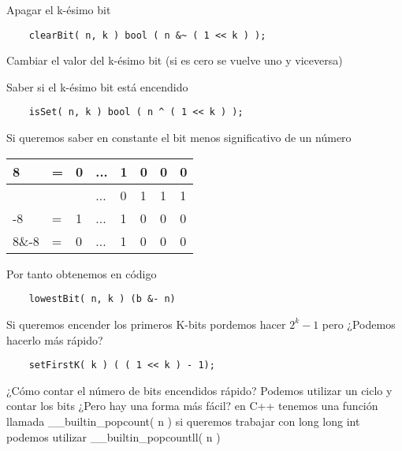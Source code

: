 Apagar el k-ésimo bit
\begin{lstlisting}
    clearBit( n, k ) bool ( n &~ ( 1 << k ) );
\end{lstlisting}

Cambiar el valor del k-ésimo bit (si es cero se vuelve uno y viceversa)

Saber si el k-ésimo bit está encendido 
\begin{lstlisting}
    isSet( n, k ) bool ( n ^ ( 1 << k ) );
\end{lstlisting}

Si queremos saber en constante el bit menos significativo de un número 

\begin{longtable}[c]{llllllll}
    \cellcolor[HTML]{FFFFFF}8                              & \cellcolor[HTML]{FFFFFF}=                        & \cellcolor[HTML]{FFFFFF}0                        & \cellcolor[HTML]{FFFFFF}... & \cellcolor[HTML]{FFFFFF}1 & 0 & 0 & 0 \\
    \endfirsthead
    \endhead
    \cellcolor[HTML]{FFFFFF}{\color[HTML]{333333} $\sim$8} & \cellcolor[HTML]{FFFFFF}{\color[HTML]{333333} =} & \cellcolor[HTML]{FFFFFF}{\color[HTML]{333333} 1} & \cellcolor[HTML]{FFFFFF}... & \cellcolor[HTML]{FFFFFF}0 & 1 & 1 & 1 \\
    -8                                                     & =                                                & 1                                                & ...                         & 1                         & 0 & 0 & 0 \\
    8\&-8                                                  & =                                                & 0                                                & ...                         & 1                         & 0 & 0 & 0
\end{longtable}

Por tanto obtenemos en código 
\begin{lstlisting}
    lowestBit( n, k ) (b &- n)
\end{lstlisting}


Si queremos encender los primeros K-bits pordemos hacer $2^{k} - 1$ pero ¿Podemos hacerlo más rápido? \break 

\begin{lstlisting}
    setFirstK( k ) ( ( 1 << k ) - 1);
\end{lstlisting}

¿Cómo contar el número de bits encendidos rápido? Podemos utilizar un ciclo y contar los bits ¿Pero hay una forma más fácil? \break 
en C++ tenemos una función llamada \textsf{\_\_builtin\_popcount( n )} si queremos trabajar con \textsf{long long int} podemos utilizar \textsf{\_\_builtin\_popcountll( n )}

